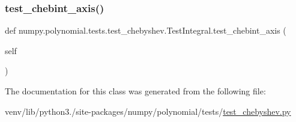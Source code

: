 \mbox{\label{classnumpy_1_1polynomial_1_1tests_1_1test__chebyshev_1_1TestIntegral_a209a22c0be337f38f1a5b89aee962d0e}} 
\subsubsection{\texorpdfstring{test\+\_\+chebint\+\_\+axis()}{test\_chebint\_axis()}}
{\footnotesize\ttfamily def numpy.\+polynomial.\+tests.\+test\+\_\+chebyshev.\+Test\+Integral.\+test\+\_\+chebint\+\_\+axis (\begin{DoxyParamCaption}\item[{}]{self }\end{DoxyParamCaption})}



The documentation for this class was generated from the following file\+:\begin{DoxyCompactItemize}
\item 
venv/lib/python3./site-\/packages/numpy/polynomial/tests/\hyperlink{test__chebyshev_8py}{test\+\_\+chebyshev.\+py}\end{DoxyCompactItemize}

